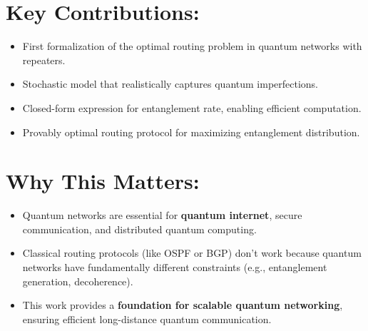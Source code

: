\documentclass{article}
\begin{document}
\section*{Key Contributions:}
\begin{itemize}
    \item First formalization of the optimal routing problem in quantum networks with repeaters.
    \item Stochastic model that realistically captures quantum imperfections.
    \item Closed-form expression for entanglement rate, enabling efficient computation.
    \item Provably optimal routing protocol for maximizing entanglement distribution.
\end{itemize}

\section*{Why This Matters:}
\begin{itemize}
    \item Quantum networks are essential for \textbf{quantum internet}, secure communication, and distributed quantum computing.
    \item Classical routing protocols (like OSPF or BGP) don’t work because quantum networks have fundamentally different constraints (e.g., entanglement generation, decoherence).
    \item This work provides a \textbf{foundation for scalable quantum networking}, ensuring efficient long-distance quantum communication.
\end{itemize}
\end{document}
